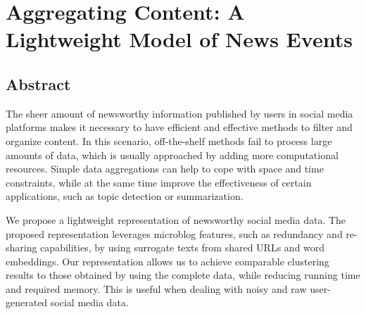 \chapter{Aggregating Content: A Lightweight Model of News Events}

\section*{Abstract}
  The sheer amount of newsworthy information published by users in social media
  platforms makes it necessary to have efficient and effective methods to filter
  and organize content. 
  In this scenario, off-the-shelf methods fail to process large amounts of data,
  which is usually approached by adding more computational resources. 
  Simple data aggregations can help to cope with space and time constraints,
  while at the same time improve the effectiveness of certain applications, such
  as topic detection or summarization. 


  We propose a lightweight representation of newsworthy social media data. 
  The proposed representation leverages microblog features, such as redundancy
  and re-sharing capabilities, by using surrogate texts from shared URLs and word embeddings.
  Our representation allows us to achieve comparable clustering results to 
  those obtained by using the complete data, while reducing running time and 
  required memory.
  This is useful when dealing with noisy and raw user-generated social media data.










